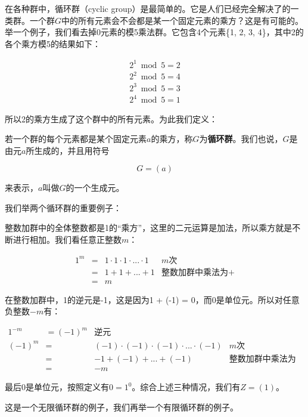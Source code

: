 \documentclass{article}
\begin{document}
在各种群中，循环群（cyclic group）是最简单的。它是人们已经完全解决了的一类群。一个群$G$中的所有元素会不会都是某一个固定元素的乘方？这是有可能的。举一个例子，我们看去掉0元素的模5乘法群。它包含4个元素\{1, 2, 3, 4\}，其中2的各个乘方模5的结果如下：

\[
\begin{array}{l}
2^1 \bmod 5 = 2 \\
2^2 \bmod 5 = 4 \\
2^3 \bmod 5 = 3 \\
2^4 \bmod 5 = 1
\end{array}
\]

所以2的乘方生成了这个群中的所有元素。为此我们定义：

\begin{definition}
若一个群的每个元素都是某个固定元素$a$的乘方，称$G$为\textbf{循环群}。我们也说，$G$是由元$a$所生成的，并且用符号

\[
G = (a)
\]

来表示，$a$叫做$G$的一个生成元。
\end{definition}

我们举两个循环群的重要例子：

\begin{example}
整数加群中的全体整数都是1的“乘方”，这里的二元运算是加法，所以乘方就是不断进行相加。我们看任意正整数$m$：

\[
\begin{array}{rcll}
1^m & = & 1 \cdot 1 \cdot 1 \cdot ... \cdot 1 & \text{$m$次} \\
    & = & 1 + 1 + ... + 1 & \text{整数加群中乘法为+} \\
    & = & m &
\end{array}
\]

在整数加群中，1的逆元是-1，这是因为1 + (-1) = 0，而0是单位元。所以对任意负整数$-m$有：

\[
\begin{array}{rcll}
1^{-m} & = (-1)^m & \text{逆元} & \\
(-1)^m & = & (-1) \cdot (-1) \cdot (-1) \cdot ... \cdot (-1) & \text{$m$次} \\
       & = & -1 + (-1) + ... + (-1) & \text{整数加群中乘法为+} \\
       & = & -m &
\end{array}
\]

最后0是单位元，按照定义有$0 = 1^0$。综合上述三种情况，我们有$Z = (1)$。
\end{example}

这是一个无限循环群的例子，我们再举一个有限循环群的例子。
\end{document}
